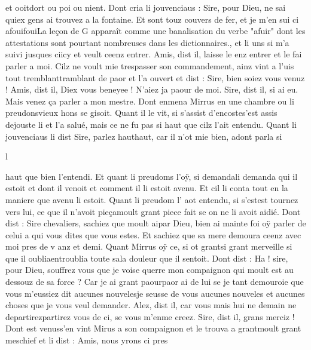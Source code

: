 \documentclass{article}
\begin{document}
\begin{pages}
                  et 
                        ooitdort ou poi ou nient. Dont cria li jouvenciaus : Sire, pour Dieu,
                  ne sai quiex gens ai trouvez a la fontaine. Et sont touz couvers de fer, et je
                  m’en sui ci 
                     afouifouiLa leçon de G apparaît comme une banalisation du
                     verbe "afuir" dont les attestations sont pourtant nombreuses dans les
                     dictionnaires., et li uns si m’a suivi 
                     jusques 
                           ciicy et veult ceenz entrer.
               Amis, dist il, laisse le enz entrer et le fai parler
                  a moi. Cilz ne voult mie trespasser son commandement, ainz vint a l’uis
               tout 
                  tremblanttramblant de paor et l’a ouvert et dist : Sire, bien soiez vous
                  venuz !
               Amis, dist il, Diex vous beneyee ! N’aiez ja paour
                  de moi.
               Sire, dist il, si ai eu. Mais venez ça parler a mon mestre. Dont enmena Mirrus en une chambre ou li
                     preudonsvieux hons se gisoit. Quant il le vit, si 
                  s’assist d’encostes'est assis dejouste li et l’a salué, mais ce ne fu pas si haut que cilz l’ait entendu. Quant li jouvenciaus li dist Sire, parlez 
                     hauthaut, car il n'ot mie bien, adont parla si 
                  
                  l
               
                  haut que bien l’entendi. Et quant li preudoms
               l’oÿ, si 
                  demandali demanda
               qui il estoit et dont il venoit et comment il li
                  estoit avenu. Et cil li conta tout en la
                     maniere que avenu li estoit.  \pend
            \pstart Quant li preudom l’
                  aot entendu, si 
                  s’estest tournez vers lui, ce que il n’avoit 
                  pieçamoult grant piece fait se on ne li avoit aidié. Dont dist : Sire chevaliers, 
                     sachiez que moult aipar Dieu, bien ai mainte foi oÿ parler de celui a qui vous dites que vous estes. Et sachiez que sa mere demoura ceenz avec moi pres de
                     v anz et demi. Quant Mirrus
               oÿ ce, si ot 
                  grantsi grant merveille si que il 
                  oubliaentroublia toute 
                  sala douleur que il sentoit. Dont dist : Ha !
                  sire, pour Dieu, souffrez vous que je voise querre mon compaignon qui moult est au dessouz de sa force ? Car 
                     je ai grant 
                     paourpaor ai de lui se je tant demouroie que 
                     vous m’eussiez dit aucunes nouvelesje seusse de vous aucunes nouveles et aucunes choses que je vous veul demander.
               Alez, dist il, car vous mais hui ne demain ne 
                     departirezpartirez vous de ci, se vous 
                     m’enme creez.
               Sire, dist il, grans merciz ! Dont 
                  est venuss'en vint
               Mirus a son
                  compaignon et le trouva a 
                  grantmoult grant meschief et li dist : Amis, nous yrons ci
                  pres 
                     

\end{pages}
\end{document}
